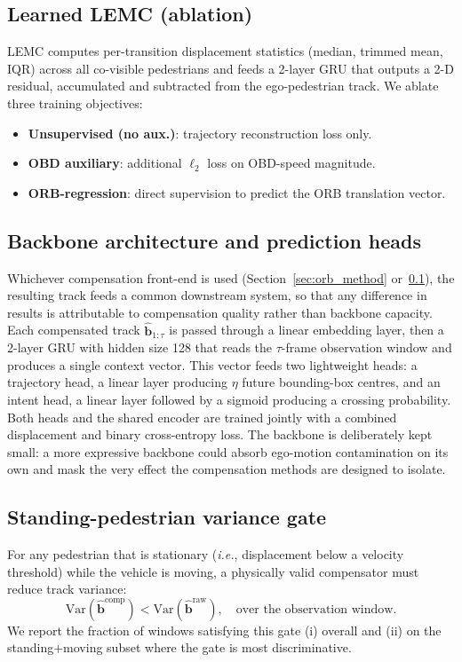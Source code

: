 \documentclass[conference]{IEEEtran}
\newcommand{\ie}{\textit{i.e.}}
\begin{document}
\subsection{Learned LEMC (ablation)}
\label{sec:lemc_method}
LEMC computes per-transition displacement statistics (median, trimmed mean, IQR) across all co-visible pedestrians and feeds a 2-layer GRU that outputs a 2-D residual, accumulated and subtracted from the ego-pedestrian track.
We ablate three training objectives:
\begin{itemize}[leftmargin=1.2em,itemsep=1pt,topsep=2pt]
  \item \textbf{Unsupervised (no aux.)}: trajectory reconstruction loss only.
  \item \textbf{OBD auxiliary}: additional $\ell_2$ loss on OBD-speed magnitude.
  \item \textbf{ORB-regression}: direct supervision to predict the ORB translation vector.
\end{itemize}

\subsection{Backbone architecture and prediction heads}
\label{sec:backbone}
Whichever compensation front-end is used (Section~\ref{sec:orb_method} or~\ref{sec:lemc_method}), the resulting track feeds a common downstream system, so that any difference in results is attributable to compensation quality rather than backbone capacity. Each compensated track $\hat{\mathbf{b}}_{1:\tau}$ is passed through a linear embedding layer, then a 2-layer GRU with hidden size 128 that reads the $\tau$-frame observation window and produces a single context vector. This vector feeds two lightweight heads: a trajectory head, a linear layer producing $\eta$ future bounding-box centres, and an intent head, a linear layer followed by a sigmoid producing a crossing probability. Both heads and the shared encoder are trained jointly with a combined displacement and binary cross-entropy loss. The backbone is deliberately kept small: a more expressive backbone could absorb ego-motion contamination on its own and mask the very effect the compensation methods are designed to isolate.

\subsection{Standing-pedestrian variance gate}
\label{sec:gate_method}
For any pedestrian that is stationary (\ie, displacement below a velocity threshold) while the vehicle is moving, a physically valid compensator must reduce track variance:
\begin{equation}
  \mathrm{Var}\!\left(\hat{\mathbf{b}}^{\text{comp}}\right) < \mathrm{Var}\!\left(\hat{\mathbf{b}}^{\text{raw}}\right), \quad \text{over the observation window}.
\end{equation}
We report the fraction of windows satisfying this gate (i) overall and (ii) on the standing+moving subset where the gate is most discriminative.
\FloatBarrier
\end{document}
